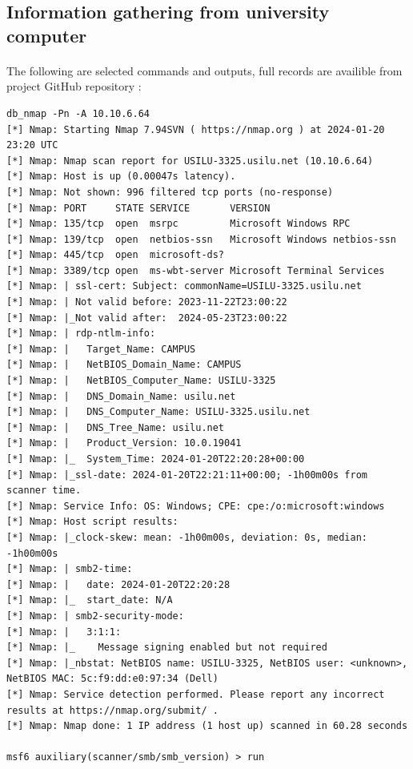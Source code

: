 \documentclass[mscthesis]{usiinfthesis}
\begin{document}
\subsection{Information gathering from university computer}
\paragraph{}
The following are selected commands and outputs, full records are availible from project GitHub repository \citep{hood:github}:

\begin{lstlisting}[language={},frame=single,breaklines=true,postbreak=\mbox{\textcolor{red}{$\hookrightarrow$}\space}]
db_nmap -Pn -A 10.10.6.64
[*] Nmap: Starting Nmap 7.94SVN ( https://nmap.org ) at 2024-01-20 23:20 UTC
[*] Nmap: Nmap scan report for USILU-3325.usilu.net (10.10.6.64)
[*] Nmap: Host is up (0.00047s latency).
[*] Nmap: Not shown: 996 filtered tcp ports (no-response)
[*] Nmap: PORT     STATE SERVICE       VERSION
[*] Nmap: 135/tcp  open  msrpc         Microsoft Windows RPC
[*] Nmap: 139/tcp  open  netbios-ssn   Microsoft Windows netbios-ssn
[*] Nmap: 445/tcp  open  microsoft-ds?
[*] Nmap: 3389/tcp open  ms-wbt-server Microsoft Terminal Services
[*] Nmap: | ssl-cert: Subject: commonName=USILU-3325.usilu.net
[*] Nmap: | Not valid before: 2023-11-22T23:00:22
[*] Nmap: |_Not valid after:  2024-05-23T23:00:22
[*] Nmap: | rdp-ntlm-info:
[*] Nmap: |   Target_Name: CAMPUS
[*] Nmap: |   NetBIOS_Domain_Name: CAMPUS
[*] Nmap: |   NetBIOS_Computer_Name: USILU-3325
[*] Nmap: |   DNS_Domain_Name: usilu.net
[*] Nmap: |   DNS_Computer_Name: USILU-3325.usilu.net
[*] Nmap: |   DNS_Tree_Name: usilu.net
[*] Nmap: |   Product_Version: 10.0.19041
[*] Nmap: |_  System_Time: 2024-01-20T22:20:28+00:00
[*] Nmap: |_ssl-date: 2024-01-20T22:21:11+00:00; -1h00m00s from scanner time.
[*] Nmap: Service Info: OS: Windows; CPE: cpe:/o:microsoft:windows
[*] Nmap: Host script results:
[*] Nmap: |_clock-skew: mean: -1h00m00s, deviation: 0s, median: -1h00m00s
[*] Nmap: | smb2-time:
[*] Nmap: |   date: 2024-01-20T22:20:28
[*] Nmap: |_  start_date: N/A
[*] Nmap: | smb2-security-mode:
[*] Nmap: |   3:1:1:
[*] Nmap: |_    Message signing enabled but not required
[*] Nmap: |_nbstat: NetBIOS name: USILU-3325, NetBIOS user: <unknown>, NetBIOS MAC: 5c:f9:dd:e0:97:34 (Dell)
[*] Nmap: Service detection performed. Please report any incorrect results at https://nmap.org/submit/ .
[*] Nmap: Nmap done: 1 IP address (1 host up) scanned in 60.28 seconds

msf6 auxiliary(scanner/smb/smb_version) > run


\end{lstlisting}
\end{document}
